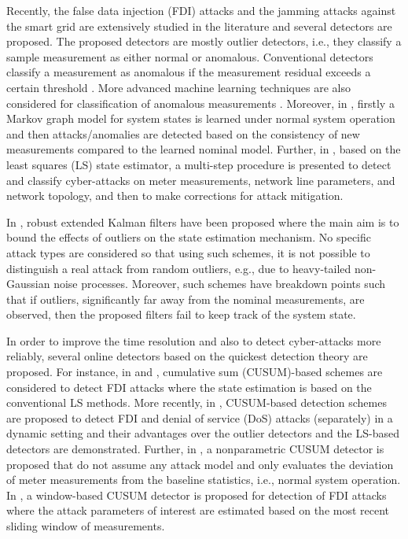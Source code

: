 \documentclass[onecolumn]{IEEEtran}
\begin{document}
Recently, the false data injection (FDI) attacks \cite{Liang16,Liu09,Tan17,moslemi2017fast} and the jamming attacks \cite{Amin09,Sargolzaei17,YLi15,Deka15} against the smart grid are extensively studied in the literature and several detectors are proposed. The proposed detectors are mostly outlier detectors, i.e., they classify a sample measurement as either normal or anomalous. Conventional detectors classify a measurement as anomalous if the measurement residual exceeds a certain threshold \cite{Abur04,Liu09,Manandhar14,Brumback87,Rawat15}. More advanced machine learning techniques are also considered for classification of anomalous measurements \cite{Esmalifalak17,Ozay16}. {Moreover, in \cite{moslemi2017fast}, firstly a Markov graph model for system states is learned under normal system operation and then attacks/anomalies are detected based on the consistency of new measurements compared to the learned nominal model. Further, in \cite{bretas2017}, based on the least squares (LS) state estimator, a multi-step procedure is presented to detect and classify cyber-attacks on meter measurements, network line parameters, and network topology, and then to make corrections for attack mitigation.}

{In \cite{zhao2017robust,zhao2017attack,gandhi2010robust}, robust extended Kalman filters have been proposed where the main aim is to bound the effects of outliers on the state estimation mechanism. No specific attack types are considered so that using such schemes, it is not possible to distinguish a real attack from random outliers, e.g., due to heavy-tailed non-Gaussian noise processes. Moreover, such schemes have breakdown points such that if outliers, significantly far away from the nominal measurements, are observed, then the proposed filters fail to keep track of the system state.}

In order to improve the time resolution and also to detect cyber-attacks more reliably, several online detectors based on the quickest detection theory are proposed. For instance, in \cite{Li_15} and \cite{Huang16}, cumulative sum (CUSUM)-based schemes are considered to detect FDI attacks where the state estimation is based on the conventional LS methods. More recently, in \cite{Necip18}, CUSUM-based detection schemes are proposed to detect FDI and denial of service (DoS) attacks (separately) in a dynamic setting and their advantages over the outlier detectors and the LS-based detectors are demonstrated. {Further, in \cite{yang2016false}, a nonparametric CUSUM detector is proposed that do not assume any attack model and only evaluates the deviation of meter measurements from the baseline statistics, i.e., normal system operation. In \cite{sun2013anomaly}, a window-based CUSUM detector is proposed for detection of FDI attacks where the attack parameters of interest are estimated based on the most recent sliding window of measurements.}
\end{document}

